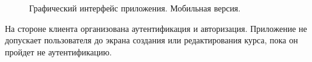 \documentclass[%
  a5paper,
  subf,
  href,
  master,
  dotsinheaders 
]{csse-fcs}
\begin{document}
\begin{figure}[H]
\begin{minipage}[H]{0.49\linewidth}
\end{minipage}
\caption{Графический интерфейс приложения. Мобильная версия.}
\label{gui_6}
\captionsetup{justification=justified}
\end{figure}
 
На стороне клиента организована аутентификация и авторизация. Приложение не допускает пользователя до экрана создания или редактирования курса, пока он пройдет не аутентификацию.
\end{document}
